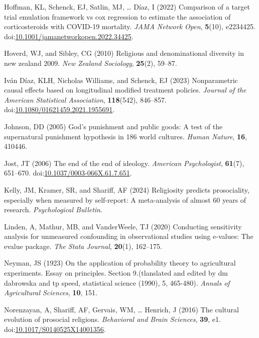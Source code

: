 \documentclass[
  single column]{article}
\newlength{\cslhangindent}
\newenvironment{CSLReferences}[2] %
 {\begin{list}{}{%
  \setlength{\itemindent}{0pt}
  \setlength{\leftmargin}{0pt}
  \setlength{\parsep}{0pt}
  \ifodd #1
   \setlength{\leftmargin}{\cslhangindent}
   \setlength{\itemindent}{-1\cslhangindent}
  \fi
  \setlength{\itemsep}{#2\baselineskip}}}
 {\end{list}}
\begin{document}
\begin{CSLReferences}{1}{0}
Hoffman, KL, Schenck, EJ, Satlin, MJ, \ldots{} Díaz, I (2022) Comparison
of a target trial emulation framework vs cox regression to estimate the
association of corticosteroids with COVID-19 mortality. \emph{JAMA
Network Open}, \textbf{5}(10), e2234425.
doi:\href{https://doi.org/10.1001/jamanetworkopen.2022.34425}{10.1001/jamanetworkopen.2022.34425}.

Hoverd, WJ, and Sibley, CG (2010) Religious and denominational diversity
in new zealand 2009. \emph{New Zealand Sociology}, \textbf{25}(2),
59--87.

Iván Díaz, KLH, Nicholas Williams, and Schenck, EJ (2023) Nonparametric
causal effects based on longitudinal modified treatment policies.
\emph{Journal of the American Statistical Association},
\textbf{118}(542), 846--857.
doi:\href{https://doi.org/10.1080/01621459.2021.1955691}{10.1080/01621459.2021.1955691}.

Johnson, DD (2005) God{'}s punishment and public goods: A test of the
supernatural punishment hypothesis in 186 world cultures. \emph{Human
Nature}, \textbf{16}, 410446.

Jost, JT (2006) The end of the end of ideology. \emph{American
Psychologist}, \textbf{61}(7), 651--670.
doi:\href{https://doi.org/10.1037/0003-066X.61.7.651}{10.1037/0003-066X.61.7.651}.

Kelly, JM, Kramer, SR, and Shariff, AF (2024) Religiosity predicts
prosociality, especially when measured by self-report: A meta-analysis
of almost 60 years of research. \emph{Psychological Bulletin}.

Linden, A, Mathur, MB, and VanderWeele, TJ (2020) Conducting sensitivity
analysis for unmeasured confounding in observational studies using
e-values: The evalue package. \emph{The Stata Journal}, \textbf{20}(1),
162--175.

Neyman, JS (1923) On the application of probability theory to
agricultural experiments. Essay on principles. Section 9.(tlanslated and
edited by dm dabrowska and tp speed, statistical science (1990), 5,
465-480). \emph{Annals of Agricultural Sciences}, \textbf{10}, 151.

Norenzayan, A, Shariff, AF, Gervais, WM, \ldots{} Henrich, J (2016) The
cultural evolution of prosocial religions. \emph{Behavioral and Brain
Sciences}, \textbf{39}, e1.
doi:\href{https://doi.org/10.1017/S0140525X14001356}{10.1017/S0140525X14001356}.


\end{CSLReferences}
\end{document}
